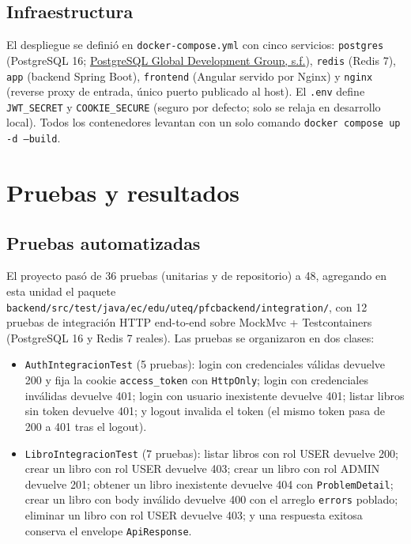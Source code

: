 \documentclass[12pt,a4paper]{article}
\begin{document}
\subsection{Infraestructura}

El despliegue se definió en \texttt{docker-compose.yml} con cinco servicios:
\texttt{postgres} (PostgreSQL 16; \hyperlink{ref:postgres}{PostgreSQL Global Development Group, s.f.}), \texttt{redis} (Redis 7), \texttt{app} (backend
Spring Boot), \texttt{frontend} (Angular servido por Nginx) y \texttt{nginx} (reverse
proxy de entrada, único puerto publicado al host). El \texttt{.env} define
\texttt{JWT\_SECRET} y \texttt{COOKIE\_SECURE} (seguro por defecto; solo se relaja en
desarrollo local). Todos los contenedores levantan con un solo comando
\texttt{docker compose up -d --build}.

\newpage

\section{Pruebas y resultados}

\subsection{Pruebas automatizadas}
\label{sec:pruebas}

El proyecto pasó de 36 pruebas (unitarias y de repositorio) a 48, agregando en esta
unidad el paquete \texttt{backend/src/test/java/ec/edu/uteq/pfcbackend/integration/},
con 12 pruebas de integración HTTP end-to-end sobre MockMvc + Testcontainers
(PostgreSQL 16 y Redis 7 reales). Las pruebas se organizaron en dos clases:

\begin{itemize}[leftmargin=1.2cm]
  \item \texttt{AuthIntegracionTest} (5 pruebas): login con credenciales válidas
        devuelve 200 y fija la cookie \texttt{access\_token} con \texttt{HttpOnly};
        login con credenciales inválidas devuelve 401; login con usuario inexistente
        devuelve 401; listar libros sin token devuelve 401; y logout invalida el token
        (el mismo token pasa de 200 a 401 tras el logout).
  \item \texttt{LibroIntegracionTest} (7 pruebas): listar libros con rol USER devuelve
        200; crear un libro con rol USER devuelve 403; crear un libro con rol ADMIN
        devuelve 201; obtener un libro inexistente devuelve 404 con \texttt{ProblemDetail};
        crear un libro con body inválido devuelve 400 con el arreglo \texttt{errors}
        poblado; eliminar un libro con rol USER devuelve 403; y una respuesta exitosa
        conserva el envelope \texttt{ApiResponse}.
\end{itemize}
\end{document}
